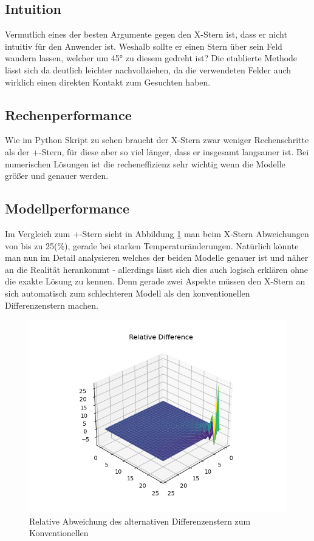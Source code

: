 \documentclass[twoside,10pt,a4paper]{article}
\numberwithin{equation}{section}					%
\numberwithin{figure}{section}						%
\begin{document}
\subsection{Intuition}
Vermutlich eines der besten Argumente gegen den X-Stern ist, dass er nicht intuitiv für den Anwender ist. Weshalb sollte er einen Stern über sein Feld wandern lassen, welcher um 45° zu diesem gedreht ist? Die etablierte Methode lässt sich da deutlich leichter nachvollziehen, da die verwendeten Felder auch wirklich einen direkten Kontakt zum Gesuchten haben.

\subsection{Rechenperformance}
Wie im Python Skript zu sehen braucht der X-Stern zwar weniger Rechenschritte als der +-Stern, für diese aber so viel länger, dass er insgesamt langsamer ist. Bei numerischen Lösungen ist die recheneffizienz sehr wichtig wenn die Modelle größer und genauer werden.

\subsection{Modellperformance}
Im Vergleich zum +-Stern sieht in Abbildung \ref{fig:relative} man beim X-Stern Abweichungen von bis zu 25(\%), gerade bei starken Temperaturänderungen. Natürlich könnte man nun im Detail analysieren welches der beiden Modelle genauer ist und näher an die Realität herankommt - allerdings lässt sich dies auch logisch erklären ohne die exakte Lösung zu kennen. Denn gerade zwei Aspekte müssen den X-Stern an sich automatisch zum schlechteren Modell als den konventionellen Differenzenstern machen.\\
\begin{figure}[H]
        \centering
        \includegraphics[width=\textwidth]{bilder/rel diff 2.png}
        \caption{Relative Abweichung des alternativen Differenzenstern zum Konventionellen}
        \label{fig:relative}
    \end{figure}
\end{document}

